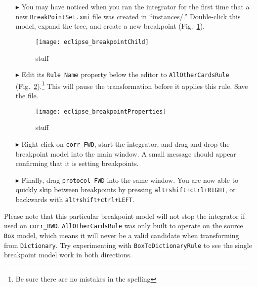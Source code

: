 \begin{itemize}

\item[$\blacktriangleright$] You may have noticed when you ran the integrator for the first time that a new \texttt{BreakPointSet.xmi} file was created in
``instances/.'' Double-click this model, expand the tree, and create a new breakpoint (Fig.~\ref{eclipse:breakpointChild}).

\begin{figure}[htbp]
\begin{center}
  \texttt{[image: eclipse\_breakpointChild]}
  \caption{stuff}
  \label{eclipse:breakpointChild}
\end{center}
\end{figure}

\item[$\blacktriangleright$] Edit its \texttt{Rule Name} property below the editor to \texttt{AllOtherCardsRule} (Fig.~\ref{eclipse:bpProps}).\footnote{Be sure
there are no mistakes in the spelling} This will pause the transformation before it applies this rule. Save the file.

\begin{figure}[htbp]
\begin{center}
  \texttt{[image: eclipse\_breakpointProperties]}
  \caption{stuff}
  \label{eclipse:bpProps}
\end{center}
\end{figure}

\item[$\blacktriangleright$] Right-click on \texttt{corr\_FWD}, start the integrator, and drag-and-drop the breakpoint model into the main window. A small
message should appear confirming that it is setting breakpoints. 

\item[$\blacktriangleright$] Finally, drag \texttt{protocol\_FWD} into the same window. You are now able to quickly skip between breakpoints by pressing
\texttt{alt+shift+ctrl+RIGHT}, or backwards with \texttt{alt+shift+ctrl+LEFT}.

\end{itemize}

Please note that this particular breakpoint model will not stop the integrator if used on \texttt{corr\_BWD}. \texttt{AllOtherCardsRule} was only built to
operate on the source \texttt{Box} model, which means it will never be a valid candidate when transforming from \texttt{Dictionary}. Try experimenting with
\texttt{BoxToDictionaryRule} to see the single breakpoint model work in both directions.
